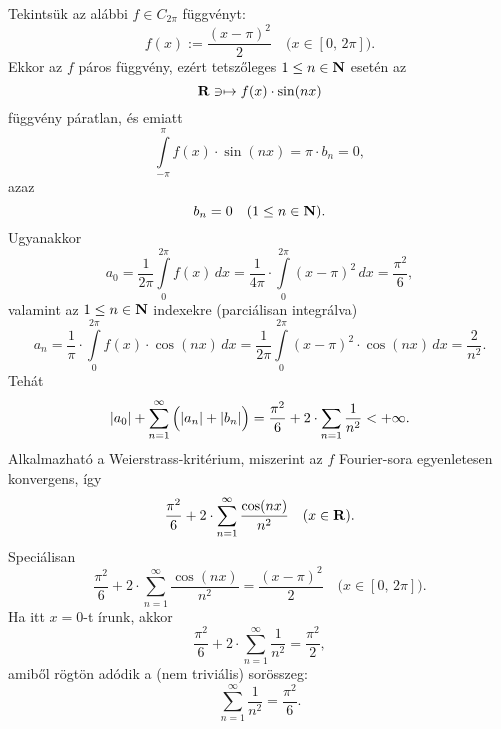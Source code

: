 Tekintsük az alábbi $f \in C_{2\pi}$ függvényt:
\[
	f(x) := \frac{(x-\pi)^2}{2} \quad \big(x \in [0, \, 2\pi]\big).
\]
Ekkor az $f$ páros függvény, ezért tetszőleges $1 \leq n \in \mathbf{N}$ esetén az
\[
	\mathbf{R} \ni \mapsto f(x) \cdot \sin(nx)
\]
függvény páratlan, és emiatt
\[
	\int\limits_{-\pi}^\pi f(x) \cdot \sin(nx) = \pi \cdot b_n = 0,
\]
azaz
\[
	b_n = 0 \quad (1 \leq n \in \mathbf{N}).
\]
Ugyanakkor
\[
	a_0 = \frac{1}{2\pi} \int\limits_0^{2\pi} f(x) \, dx = \frac{1}{4\pi} \cdot \int\limits_0^{2\pi} (x - \pi)^2 \, dx = \frac{\pi^2}{6},
\]
valamint az $1 \leq n \in \mathbf{N}$ indexekre (parciálisan integrálva)
\[
	a_n = \frac{1}{\pi} \cdot \int\limits_0^{2\pi} f(x) \cdot \cos(nx) \, dx = \frac{1}{2\pi} \int\limits_0^{2\pi} (x-\pi)^2 \cdot \cos(nx) \, dx = \frac{2}{n^2}.
\]
Tehát
\[
	|a_0| + \sum_{n=1}^\infty \Big(  |a_n| + |b_n|  \Big) = \frac{\pi^2}{6} + 2 \cdot \sum_{n=1} \frac{1}{n^2} < + \infty.
\]
Alkalmazható a Weierstrass-kritérium, miszerint az $f$ Fourier-sora egyenletesen konvergens, így
\[
	\frac{\pi^2}{6} + 2 \cdot \sum_{n=1}^\infty \frac{\cos(nx)}{n^2} \quad (x \in \mathbf{R}).
\]
Speciálisan
\[
	\frac{\pi^2}{6} + 2 \cdot \sum_{n=1}^\infty \frac{\cos(nx)}{n^2} = \frac{(x-\pi)^2}{2} \quad \big(x \in [0, \, 2\pi]\big).
\]
Ha itt $x = 0$-t írunk, akkor
\[
	\frac{\pi^2}{6} + 2 \cdot \sum_{n=1}^\infty \frac{1}{n^2} = \frac{\pi^2}{2},
\]
amiből rögtön adódik a (nem triviális) sorösszeg:
\[
	\sum_{n=1}^\infty \frac{1}{n^2} = \frac{\pi^2}{6}.
\]